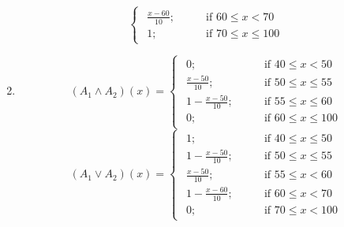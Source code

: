 \documentclass[../main-sheet.tex]{subfiles}
\begin{document}
\begin{ex}
\begin{enumerate}
\[\begin{cases}
\begin{aligned}
                    \frac{x-60}{10}; \qquad&\text{if }60\leq x<70\\
                    1; \qquad&\text{if }70\leq x\leq 100
                \end{aligned}
            \end{cases}
            \]
        \item 
        \[
            (A_1\wedge A_2)(x)=\begin{cases}
                \begin{aligned}
                    0; \qquad&\text{if }40\leq x<50\\
                    \frac{x-50}{10}; \qquad&\text{if }50\leq x\leq 55\\
                    1-\frac{x-50}{10}; \qquad&\text{if }55\leq x\leq 60\\
                    0; \qquad&\text{if }60\leq x\leq 100
                \end{aligned}
            \end{cases}
            \]
        \[
            (A_1\vee A_2)(x)=\begin{cases}
                \begin{aligned}
                    1; \qquad&\text{if }40\leq x\leq 50\\
                    1-\frac{x-50}{10}; \qquad&\text{if }50\leq x\leq 55\\
                    \frac{x-50}{10}; \qquad&\text{if }55\leq x< 60\\
                    1-\frac{x-60}{10}; \qquad&\text{if }60\leq x< 70\\
                    0; \qquad&\text{if }70\leq x< 100
                \end{aligned}
            \end{cases}
            \]
\end{enumerate}
\end{ex}
\end{document}
